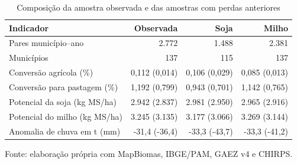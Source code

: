 \begin{table}[htbp]
\centering\small\captionstyle{\centering}\normalcaption
\caption{Composição da amostra observada e das amostras com perdas anteriores}\label{tab:h1b-composicao}
\begin{tabular}{lrrr}
\hline
Indicador & Observada & Soja & Milho \\
\hline
Pares município--ano & 2.772 & 1.488 & 2.381 \\
Municípios & 137 & 115 & 137 \\
Conversão agrícola (\%) & 0,112 (0,014) & 0,106 (0,029) & 0,085 (0,013) \\
Conversão para pastagem (\%) & 1,192 (0,799) & 0,943 (0,701) & 1,142 (0,765) \\
Potencial da soja (kg MS/ha) & 2.942 (2.837) & 2.981 (2.950) & 2.965 (2.916) \\
Potencial do milho (kg MS/ha) & 3.245 (3.135) & 3.177 (3.066) & 3.269 (3.144) \\
Anomalia de chuva em t (mm) & -31,4 (-36,4) & -33,3 (-43,7) & -33,3 (-41,2) \\
\hline
\end{tabular}
\par\smallskip\begin{minipage}{\textwidth}\footnotesize\centering
Fonte: elaboração própria com MapBiomas, IBGE/PAM, GAEZ v4 e CHIRPS.
\end{minipage}
\end{table}
